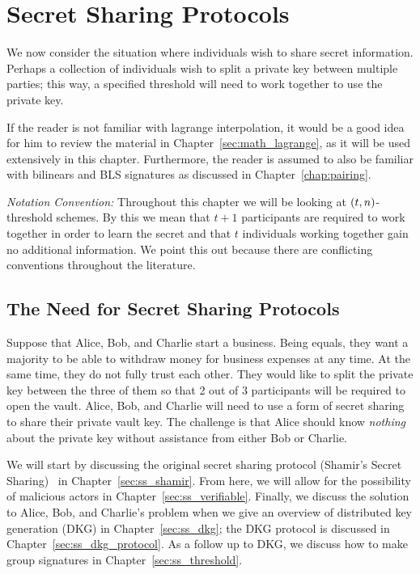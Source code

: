 \chapter{Secret Sharing Protocols}
\label{chap:secret_sharing}

We now consider the situation where individuals wish to share
secret information.
Perhaps a collection of individuals wish to split a private key
between multiple parties;
this way, a specified threshold will need to work together
to use the private key.

If the reader is not familiar with \gls{lagrange interpolation},
it would be a good idea for him to review the material
in Chapter~\ref{sec:math_lagrange}, as it will be used extensively
in this chapter.
Furthermore, the reader is assumed to also be familiar with
\glspl{bilinear} and BLS signatures as discussed in Chapter~\ref{chap:pairing}.

\emph{Notation Convention:}
Throughout this chapter we will be looking at
$\left( t,n \right)$-threshold schemes.
By this we mean that $t+1$ participants are required to work together
in order to learn the secret
and that $t$ individuals working together gain no additional information.
We point this out because there are conflicting conventions
throughout the literature.

\section{The Need for Secret Sharing Protocols}

Suppose that Alice, Bob, and Charlie start a business.
Being equals, they want a majority to be able to withdraw
money for business expenses at any time.
At the same time, they do not fully trust each other.
They would like to split the private key between the three of them
so that 2 out of 3 participants will be required to open the vault.
Alice, Bob, and Charlie will need to use a form of secret sharing
to share their private vault key.
The challenge is that Alice should know
\emph{nothing} about the private key without assistance from either
Bob or Charlie.

We will start by discussing the original secret sharing
protocol (Shamir's Secret Sharing)~\cite{shamir1979share}
in Chapter~\ref{sec:ss_shamir}.
From here, we will allow for the possibility of malicious
actors in Chapter~\ref{sec:ss_verifiable}.
Finally, we discuss the solution to Alice, Bob, and Charlie's
problem when we give an overview of \gls{distributed key generation} (DKG)
in Chapter~\ref{sec:ss_dkg};
the DKG protocol is discussed in Chapter~\ref{sec:ss_dkg_protocol}.
As a follow up to DKG, we discuss how to make group signatures
in Chapter~\ref{sec:ss_threshold}.


